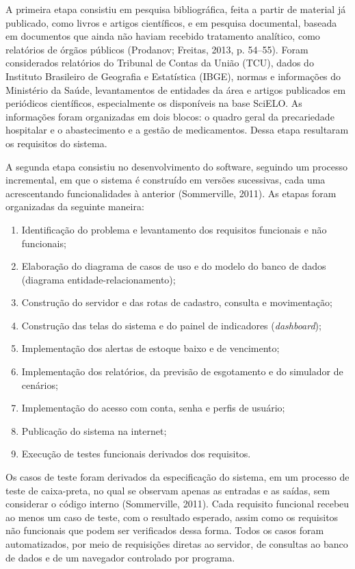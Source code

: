 \documentclass[12pt,a4paper]{article}
\begin{document}
A primeira etapa consistiu em pesquisa bibliográfica, feita a partir de material já publicado, como livros e artigos científicos, e em pesquisa documental, baseada em documentos que ainda não haviam recebido tratamento analítico, como relatórios de órgãos públicos (Prodanov; Freitas, 2013, p. 54--55). Foram considerados relatórios do Tribunal de Contas da União (TCU), dados do Instituto Brasileiro de Geografia e Estatística (IBGE), normas e informações do Ministério da Saúde, levantamentos de entidades da área e artigos publicados em periódicos científicos, especialmente os disponíveis na base SciELO. As informações foram organizadas em dois blocos: o quadro geral da precariedade hospitalar e o abastecimento e a gestão de medicamentos. Dessa etapa resultaram os requisitos do sistema.

A segunda etapa consistiu no desenvolvimento do software, seguindo um processo incremental, em que o sistema é construído em versões sucessivas, cada uma acrescentando funcionalidades à anterior (Sommerville, 2011). As etapas foram organizadas da seguinte maneira:

\begin{enumerate}
  \item Identificação do problema e levantamento dos requisitos funcionais e não funcionais;
  \item Elaboração do diagrama de casos de uso e do modelo do banco de dados (diagrama entidade-relacionamento);
  \item Construção do servidor e das rotas de cadastro, consulta e movimentação;
  \item Construção das telas do sistema e do painel de indicadores (\textit{dashboard});
  \item Implementação dos alertas de estoque baixo e de vencimento;
  \item Implementação dos relatórios, da previsão de esgotamento e do simulador de cenários;
  \item Implementação do acesso com conta, senha e perfis de usuário;
  \item Publicação do sistema na internet;
  \item Execução de testes funcionais derivados dos requisitos.
\end{enumerate}

Os casos de teste foram derivados da especificação do sistema, em um processo de teste de caixa-preta, no qual se observam apenas as entradas e as saídas, sem considerar o código interno (Sommerville, 2011). Cada requisito funcional recebeu ao menos um caso de teste, com o resultado esperado, assim como os requisitos não funcionais que podem ser verificados dessa forma. Todos os casos foram automatizados, por meio de requisições diretas ao servidor, de consultas ao banco de dados e de um navegador controlado por programa.
\end{document}

